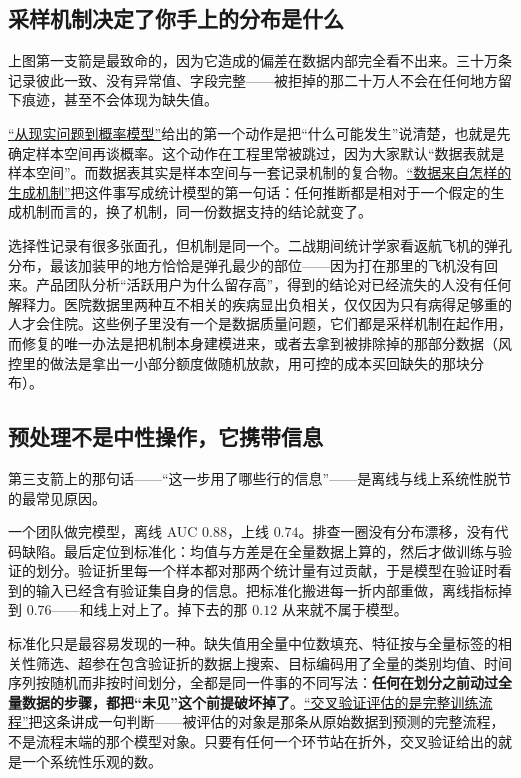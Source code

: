 \subsection{采样机制决定了你手上的分布是什么}

上图第一支箭是最致命的，因为它造成的偏差在数据内部完全看不出来。三十万条记录彼此一致、没有异常值、字段完整——被拒掉的那二十万人不会在任何地方留下痕迹，甚至不会体现为缺失值。

\hyperref[sec:05-Probability/01-Probability-Spaces/03]{``从现实问题到概率模型''}给出的第一个动作是把``什么可能发生''说清楚，也就是先确定样本空间再谈概率。这个动作在工程里常被跳过，因为大家默认``数据表就是样本空间''。而数据表其实是样本空间与一套记录机制的复合物。\hyperref[sec:11-Mathematical-Statistics/01-Statistical-Models/01]{``数据来自怎样的生成机制''}把这件事写成统计模型的第一句话：任何推断都是相对于一个假定的生成机制而言的，换了机制，同一份数据支持的结论就变了。

选择性记录有很多张面孔，但机制是同一个。二战期间统计学家看返航飞机的弹孔分布，最该加装甲的地方恰恰是弹孔最少的部位——因为打在那里的飞机没有回来。产品团队分析``活跃用户为什么留存高''，得到的结论对已经流失的人没有任何解释力。医院数据里两种互不相关的疾病显出负相关，仅仅因为只有病得足够重的人才会住院。这些例子里没有一个是数据质量问题，它们都是采样机制在起作用，而修复的唯一办法是把机制本身建模进来，或者去拿到被排除掉的那部分数据（风控里的做法是拿出一小部分额度做随机放款，用可控的成本买回缺失的那块分布）。

\subsection{预处理不是中性操作，它携带信息}

第三支箭上的那句话——``这一步用了哪些行的信息''——是离线与线上系统性脱节的最常见原因。

一个团队做完模型，离线 AUC \(0.88\)，上线 \(0.74\)。排查一圈没有分布漂移，没有代码缺陷。最后定位到标准化：均值与方差是在全量数据上算的，然后才做训练与验证的划分。验证折里每一个样本都对那两个统计量有过贡献，于是模型在验证时看到的输入已经含有验证集自身的信息。把标准化搬进每一折内部重做，离线指标掉到 \(0.76\)——和线上对上了。掉下去的那 \(0.12\) 从来就不属于模型。

标准化只是最容易发现的一种。缺失值用全量中位数填充、特征按与全量标签的相关性筛选、超参在包含验证折的数据上搜索、目标编码用了全量的类别均值、时间序列按随机而非按时间划分，全都是同一件事的不同写法：\textbf{任何在划分之前动过全量数据的步骤，都把``未见''这个前提破坏掉了}。\hyperref[sec:11-Mathematical-Statistics/06-Resampling-and-Model-Selection/03]{``交叉验证评估的是完整训练流程''}把这条讲成一句判断——被评估的对象是那条从原始数据到预测的完整流程，不是流程末端的那个模型对象。只要有任何一个环节站在折外，交叉验证给出的就是一个系统性乐观的数。

